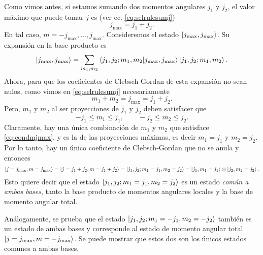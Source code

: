 \documentclass[10pt, a4paper]{article}
\newcommand{\jmax}{j_{\text{max}}}
\numberwithin{equation}{subsection}
\begin{document}
Como vimos antes, si estamos sumando dos momentos angulares $j_1$ y $j_2$, el
valor máximo que puede tomar $j$ es (ver ec. \eqref{eq:selrulesumj})
\begin{equation}
  \jmax = j_1 + j_2.
\end{equation}
En tal caso, $m = -\jmax, \ldots, \jmax$. Consideremos el
estado $\ket{\jmax, \jmax}$. Su expansión en la base producto
es
\begin{equation}
  \ket{\jmax, \jmax} =
  \sum_{m_1,m_2}\braket{j_1,j_2;m_1,m_2}{\jmax,\jmax}
  \ket{j_1,j_2;m_1,m_2}.
\end{equation}
Ahora, para que los coeficientes de Clebsch-Gordan de esta expansión no sean
nulos, como vimos en \eqref{eq:selrulesumj} necesariamente
\begin{equation} \label{eq:condmjmax}
  m_1 + m_2 = \jmax = j_1 + j_2.
\end{equation}
Pero, $m_1$ y $m_2$ al ser proyecciones de $j_1$ y $j_2$ deben satisfacer que
\begin{equation}
  -j_1 \leq m_1 \leq j_1, \qquad -j_2 \leq m_2 \leq j_2.
\end{equation}
Claramente, hay una única combinación de $m_1$ y $m_2$ que satisface
\eqref{eq:condmjmax}, y es la de las proyecciones máximas, es decir $m_1 =
j_1$ y $m_2 = j_2$. Por lo tanto, hay un único coeficiente de Clebsch-Gordan
que no se anula y entonces
\begin{equation}
  \ket{j = \jmax, m = \jmax} =
  \ket{j = j_1 + j_2, m = j_1 + j_2} =
  \ket{j_1,j_2;m_1 = j_1,m_2 = j_2} =
  \ket{j_1,m_1=j_1}\tensor\ket{j_2,m_2=j_2}.
\end{equation}
Esto quiere decir que el estado $\ket{j_1,j_2;m_1 = j_1,m_2 = j_2}$ es un
estado \emph{común a ambas bases}, tanto la base producto de momentos angulares
locales y la base de momento angular total.

Análogamente, se prueba que el estado $\ket{j_1,j_2;m_1 = -j_1, m_2 = -j_2}$
también es un estado de ambas bases y corresponde al estado de momento angular
total $\ket{j = \jmax, m = -\jmax}$. Se puede mostrar que
estos dos son los únicos estados comunes a ambas bases.
\end{document}
